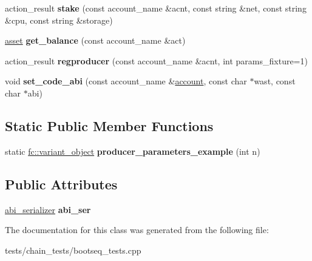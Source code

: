 \begin{DoxyCompactItemize}
action\+\_\+result {\bfseries stake} (const account\+\_\+name \&acnt, const string \&net, const string \&cpu, const string \&storage)
\item 
\mbox{\label{classbootseq__tester_a0928ad9c565d061ce132ac14d40b649e}} 
\mbox{\hyperlink{structaacio_1_1asset}{asset}} {\bfseries get\+\_\+balance} (const account\+\_\+name \&act)
\item 
\mbox{\label{classbootseq__tester_abfc7cb3cdcd052a610a4b7cc532bd396}} 
action\+\_\+result {\bfseries regproducer} (const account\+\_\+name \&acnt, int params\+\_\+fixture=1)
\item 
\mbox{\label{classbootseq__tester_a4975d416f48a5ff314d931965e007b9b}} 
void {\bfseries set\+\_\+code\+\_\+abi} (const account\+\_\+name \&\mbox{\hyperlink{structaccount}{account}}, const char $\ast$wast, const char $\ast$abi)
\end{DoxyCompactItemize}
\subsection*{Static Public Member Functions}
\begin{DoxyCompactItemize}
\item 
\mbox{\label{classbootseq__tester_a5b5258f8a3bb3956d0fa709483d63948}} 
static \mbox{\hyperlink{classfc_1_1variant__object}{fc\+::variant\+\_\+object}} {\bfseries producer\+\_\+parameters\+\_\+example} (int n)
\end{DoxyCompactItemize}
\subsection*{Public Attributes}
\begin{DoxyCompactItemize}
\item 
\mbox{\label{classbootseq__tester_a2f21db9754306d1d88d2beafcd8e20b7}} 
\mbox{\hyperlink{structaacio_1_1chain_1_1contracts_1_1abi__serializer}{abi\+\_\+serializer}} {\bfseries abi\+\_\+ser}
\end{DoxyCompactItemize}


The documentation for this class was generated from the following file\+:\begin{DoxyCompactItemize}
\item 
tests/chain\+\_\+tests/bootseq\+\_\+tests.\+cpp\end{DoxyCompactItemize}

